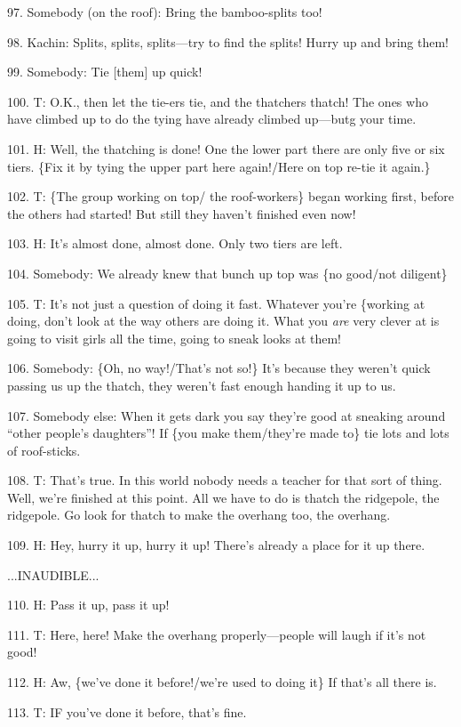 97. Somebody (on the roof): Bring the bamboo-splits too!

98. Kachin: Splits, splits, splits---try to find the splits!  Hurry up and bring
them!

99. Somebody: Tie [them] up quick!

100. T: O.K., then let the tie-ers tie, and the thatchers thatch!  The ones who
have climbed up to do the tying have already climbed up---butg your time.

101. H: Well, the thatching is done!  One the lower part there are only five or
six tiers.  \{Fix it by tying the upper part here again!/Here on top re-tie it
again.\}

102. T: \{The group working on top/ the roof-workers\} began working first, before
the others had started!  But still they haven't finished even now!

103. H: It's almost done, almost done.  Only two tiers are left.

104. Somebody: We already knew that bunch up top was \{no good/not diligent\}

105. T: It's not just a question of doing it fast.  Whatever you're \{working at
doing, don't look at the way others are doing it.  What you \textit{are} very clever
at is going to visit girls all the time, going to sneak looks at them!

106. Somebody: \{Oh, no way!/That's not so!\}  It's because they weren't quick
passing us up the thatch, they weren't fast enough handing it up to us.

107. Somebody else: When it gets dark you say they're good at sneaking around ``other
people's daughters''!  If \{you make them/they're made to\} tie lots and lots of
roof-sticks.

108. T: That's true.  In this world nobody needs a teacher for that sort of thing.
Well, we're finished at this point.  All we have to do is thatch the ridgepole,
the ridgepole.  Go look for thatch to make the overhang too, the overhang.

109. H: Hey, hurry it up, hurry it up!  There's already a place for it up there.

...INAUDIBLE...

110. H: Pass it up, pass it up!

111. T: Here, here! Make the overhang properly---people will laugh if it's not
good!

112. H: Aw, \{we've done it before!/we're used to doing it\}  If that's all there
is.

113. T: IF you've done it before, that's fine.


